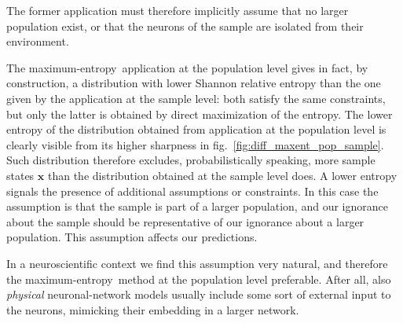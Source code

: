 \documentclass{article}
\theoremstyle{remark}
\theoremstyle{innote}
\renewcommand*{\|}{\mathpunct{|}}%
\newcommand*{\fig}{fig.}%
\theoremstyle{simple}
\newcommand*{\yxx}{x}%
\newcommand*{\yx}{\bm{\yxx}}%
\newcommand*{\me}{maximum-entropy}
\begin{document}
The former application must therefore implicitly assume that no
larger population exist, or that the neurons of the sample are isolated
from their environment.

The \me\ application at the population level gives in fact, by
construction, a distribution with lower Shannon relative entropy than the
one given by the application at the sample level: both satisfy the same
constraints, but only the latter is obtained by direct maximization of the
entropy. The lower entropy of the distribution obtained from application at
the population level is clearly visible from its higher sharpness in
\fig~\ref{fig:diff_maxent_pop_sample}. Such distribution therefore
excludes, probabilistically speaking, more sample states $\yx$ than the
distribution obtained at the sample level does. A lower entropy signals the
presence of additional assumptions or constraints. In this case the
assumption is that the sample is part of a larger population, and our
ignorance about the sample should be representative of our ignorance about
a larger population. This assumption affects our predictions.

In a neuroscientific context we find this assumption very natural, and
therefore the \me\ method at the population level preferable. After all,
also \emph{physical} neuronal-network models usually include some sort of
external input to the neurons, mimicking their embedding in a larger
network.
\end{document}
